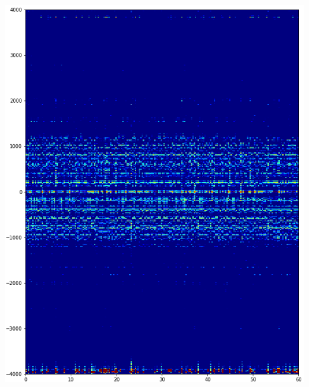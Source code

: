 \documentclass[a0,portrait]{a0poster}
\begin{document}
\begin{multicols}{2}
\begin{tcolorbox}[colback=blue!5!white,colframe=blue!75!black,title,title={\section*{Résultats}}]
\begin{minipage}{0.2\textwidth}
    \includegraphics[width=1.0\textwidth]{./iter=40000.png}
\end{minipage}%
\begin{minipage}{0.2\textwidth}

\end{minipage}
\end{tcolorbox}
\end{multicols}
\end{document}
